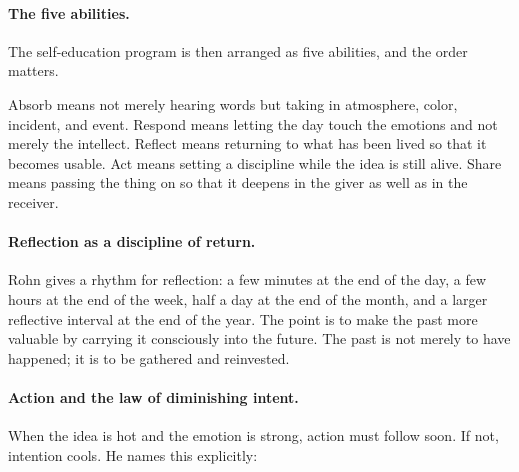 \paragraph{The five abilities.}
The self-education program is then arranged as five abilities, and the order matters.

\begin{figure}
\centering
{}
\end{figure}

Absorb means not merely hearing words but taking in atmosphere, color, incident, and event. Respond means letting the day touch the emotions and not merely the intellect. Reflect means returning to what has been lived so that it becomes usable. Act means setting a discipline while the idea is still alive. Share means passing the thing on so that it deepens in the giver as well as in the receiver.

\paragraph{Reflection as a discipline of return.}
Rohn gives a rhythm for reflection: a few minutes at the end of the day, a few hours at the end of the week, half a day at the end of the month, and a larger reflective interval at the end of the year. The point is to make the past more valuable by carrying it consciously into the future. The past is not merely to have happened; it is to be gathered and reinvested.

\paragraph{Action and the law of diminishing intent.}
When the idea is hot and the emotion is strong, action must follow soon. If not, intention cools. He names this explicitly:

